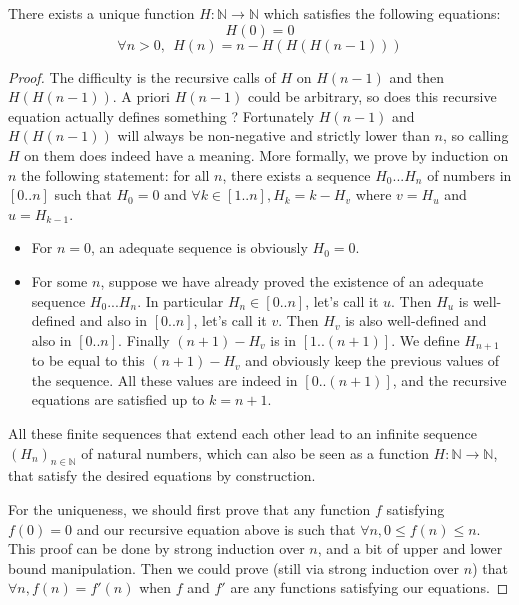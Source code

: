 \documentclass[a4paper,11pt]{article}
\begin{document}
\begin{theorem}\label{defG}There exists a unique function
  $H:\mathbb{N}\to\mathbb{N}$ which satisfies the following
  equations:
  $$H(0) = 0$$
  $$\forall n>0,~~ H(n) = n - H(H(H(n-1)))$$
\end{theorem}
\begin{proof}
The difficulty is the recursive calls of $H$ on $H(n-1)$ and then $H(H(n-1))$.
A priori $H(n-1)$ could be arbitrary, so does this recursive equation
actually defines something ? Fortunately $H(n-1)$ and
$H(H(n-1))$ will always be non-negative and strictly lower than $n$, so
calling $H$ on them does indeed have a meaning.
More formally, we prove by induction on $n$ the following
statement: for all $n$, there exists a sequence $H_0...H_n$
of numbers in $[0..n]$ such that $H_0=0$ and
$\forall k\in[1..n], H_k = k - H_{v}$ where $v = H_u$ and $u = H_{k-1}$.
\begin{itemize}
\item For $n=0$, an adequate sequence is obviously $H_0 = 0$.
\item For some $n$, suppose we have already proved the existence
  of an adequate sequence $H_0...H_n$.
  In particular $H_n \in [0..n]$, let's call it $u$.
  Then $H_u$ is well-defined and also in $[0..n]$, let's call it $v$.
  Then $H_v$ is also well-defined and also in $[0..n]$.
  Finally $(n+1)-H_v$ is in $[1..(n+1)]$. We define $H_{n+1}$ to be
  equal to this $(n+1)-H_v$ and obviously keep the previous values of the
  sequence. All these values are indeed in $[0..(n+1)]$, and the
  recursive equations are satisfied up to $k=n+1$.
\end{itemize}
All these finite sequences that extend each other
lead to an infinite sequence $(H_n)_{n\in\mathbb{N}}$ of natural
numbers, which can also be seen as a function
$H:\mathbb{N}\to\mathbb{N}$, that satisfy the desired equations
by construction.

For the uniqueness, we should first prove that any function $f$
satisfying $f(0)=0$ and our recursive equation above is such that
$\forall n, 0\le f(n)\le n$. This proof can be done by strong
induction over $n$, and a bit of upper and lower bound manipulation.
Then we could prove (still via strong induction
over $n$) that $\forall n, f(n)=f'(n)$ when $f$ and $f'$
are any functions satisfying our equations.
\end{proof}
\end{document}
